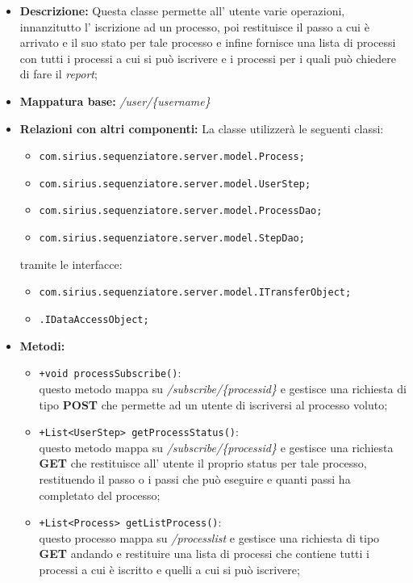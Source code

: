 \begin{itemize}
	\item \textbf{Descrizione: } Questa classe permette all' utente varie operazioni, innanzitutto l' iscrizione ad un processo, poi restituisce il passo a cui è arrivato e il suo stato per tale processo e infine fornisce una lista di processi con tutti i processi a cui si può iscrivere e i processi per i quali può chiedere di fare il \textit{report};
	\item \textbf{Mappatura base: } \textit{\slash user\slash \{username\}}
	\item \textbf{Relazioni con altri componenti: }
	La classe utilizzerà le seguenti classi:
	\begin{itemize}
		\item \texttt{com.sirius.sequenziatore.server.model.Process;}
		\item \texttt{com.sirius.sequenziatore.server.model.UserStep;}
		\item \texttt{com.sirius.sequenziatore.server.model.ProcessDao;}
		\item \texttt{com.sirius.sequenziatore.server.model.StepDao;}
	\end{itemize}
	tramite le interfacce:
	\begin{itemize}
		\item \texttt{com.sirius.sequenziatore.server.model.ITransferObject;}
		\item \texttt{\sModel .IDataAccessObject;}
	\end{itemize}
	\item \textbf{Metodi: }\begin{itemize}
					\item \texttt{+void processSubscribe()}:\\
					questo metodo mappa su \textit{\slash subscribe\slash \{processid\}} e gestisce una richiesta di tipo \textbf{POST} che permette ad un utente di iscriversi al processo voluto;
					\item \texttt{+List<UserStep> getProcessStatus()}:\\
					questo metodo mappa su \textit{\slash subscribe\slash \{processid\}} e gestisce una richiesta \textbf{GET} che restituisce all' utente il proprio status per tale processo, restituendo il passo o i passi che può eseguire e quanti passi ha completato del processo;
					\item \texttt{+List<Process> getListProcess()}:\\
					questo processo mappa su \textit{\slash processlist} e gestisce una richiesta di tipo \textbf{GET} andando e restituire una lista di processi che contiene tutti i processi  a cui è iscritto e quelli a cui si può iscrivere;
				\end{itemize}
\end{itemize}
